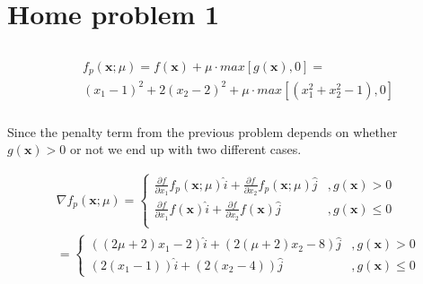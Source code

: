 \documentclass{article}
\begin{document}
\section{Home problem 1}
\subsection{}
\subsubsection{}

\begin{align*}
  &f_\mathit{p}(\mathbf{x}; \mu) = f(\mathbf{x}) + \mu \cdot max \left[ g(\mathbf{x}), 0 \right]  = \\
  &(x_1 - 1)^2 + 2(x_2 - 2)^2 + \mu \cdot max \left[ (x_1^2 + x_2^2 - 1 ), 0 \right]
\end{align*}

\subsubsection{}

Since the penalty term from the previous problem depends on whether
$g(\mathbf{x}) > 0$ or not we end up with two different cases.

\begin{align*}
  & \nabla f_\mathit{p}(\mathbf{x}; \mu) =
  \begin{cases}
    \frac{\partial f}{\partial x_1}f_\mathit{p}(\mathbf{x}; \mu) \hat{i} +
    \frac{\partial f}{\partial x_2}f_\mathit{p}(\mathbf{x}; \mu) \hat{j} &,g(\mathbf{x}) > 0 \\
    \frac{\partial f}{\partial x_1}f(\mathbf{x}) \hat{i} +
    \frac{\partial f}{\partial x_2}f(\mathbf{x}) \hat{j} &,g(\mathbf{x}) \leq 0 \\
  \end{cases} \\
  & =
  \begin{cases}
    ((2\mu + 2)x_1 - 2) \hat{i} + (2(\mu + 2)x_2 - 8) \hat{j} &,g(\mathbf{x}) > 0 \\
    (2 (x_1 - 1)) \hat{i} + (2 (x_2 - 4)) \hat{j} &,g(\mathbf{x}) \leq 0
  \end{cases}
\end{align*}

\subsection{}
\subsubsection{}
\end{document}
